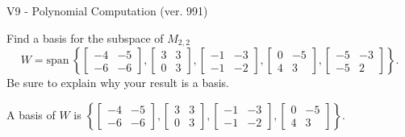 \begin{exercise}
  \begin{exerciseTitle}V9 - Polynomial Computation (ver. 991)\end{exerciseTitle}
  \begin{exerciseStatement}
    Find a basis for the subspace of \(M_{2,2}\) 
\[W=\mathrm{span}\ \left\{\left[\begin{array}{cc}
-4 & -5 \\
-6 & -6
\end{array}\right] , \left[\begin{array}{cc}
3 & 3 \\
0 & 3
\end{array}\right] , \left[\begin{array}{cc}
-1 & -3 \\
-1 & -2
\end{array}\right] , \left[\begin{array}{cc}
0 & -5 \\
4 & 3
\end{array}\right] , \left[\begin{array}{cc}
-5 & -3 \\
-5 & 2
\end{array}\right]\right\}.\]
 Be sure to explain why your result is a basis.


  \end{exerciseStatement}
  \begin{exerciseAnswer}
   A basis of \(W\) is  \(\left\{\left[\begin{array}{cc}
-4 & -5 \\
-6 & -6
\end{array}\right] , \left[\begin{array}{cc}
3 & 3 \\
0 & 3
\end{array}\right] , \left[\begin{array}{cc}
-1 & -3 \\
-1 & -2
\end{array}\right] , \left[\begin{array}{cc}
0 & -5 \\
4 & 3
\end{array}\right]\right\}\).
  


  \end{exerciseAnswer}
\end{exercise}